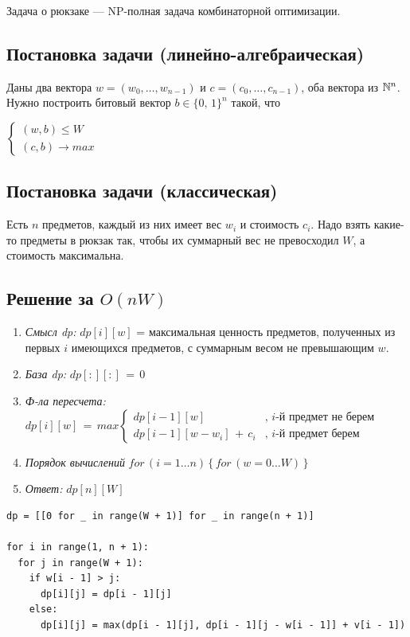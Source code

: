 \Def Задача о рюкзаке — NP-полная задача комбинаторной оптимизации.

\subsection*{Постановка задачи (линейно-алгебраическая)}

Даны два вектора $w = (w_0, \dots , w_{n-1})$ и $c = (c_0, \dots , c_{n-1})$, оба вектора
из $\mathbb{N}^n$. Нужно построить битовый вектор $b \in \{0,\,1\}^n$ такой, что

\begin{center}
    \large
    $\begin{cases}
    (w, b) \leq W\\
    (c, b) \rightarrow max
    \end{cases}$
\end{center}

\subsection*{Постановка задачи (классическая)}

Есть $n$ предметов, каждый из них имеет вес $w_i$ и стоимость $c_i$. Надо взять какие-то предметы в рюкзак так, чтобы их суммарный вес не превосходил $W$, а стоимость максимальна.

\subsection*{Решение за $O(nW)$}

\begin{enumerate}
    \item \textit{Смысл dp:} $dp[i][w]$ = максимальная ценность предметов, полученных из первых $i$ имеющихся предметов, с суммарным весом не превышающим $w$.
    \item \textit{База dp:} $dp[:][:]\,=\,0$
    \item \textit{Ф-ла пересчета:} $dp[i][w]\,=\,max
    \begin{cases}
        dp[i-1][w] & \text{, $i$-й предмет не берем}\\
        dp[i-1][w-w_i]\,+\,c_i  & \text{, $i$-й предмет берем}
    \end{cases}$
    \item \textit{Порядок вычислений} $for\,(i = 1 \dots n)\,\{\,for\,(w = 0 \dots W)\,\}$
    \item \textit{Ответ:} $dp[n][W]$
\end{enumerate}

\begin{lstlisting}
dp = [[0 for _ in range(W + 1)] for _ in range(n + 1)]

for i in range(1, n + 1):
  for j in range(W + 1):
    if w[i - 1] > j:  
      dp[i][j] = dp[i - 1][j]
    else:
      dp[i][j] = max(dp[i - 1][j], dp[i - 1][j - w[i - 1]] + v[i - 1])
\end{lstlisting}

\pagebreak